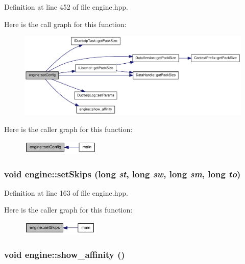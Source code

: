 Definition at line 452 of file engine.hpp.

Here is the call graph for this function:\nopagebreak
\begin{figure}[H]
\begin{center}
\leavevmode
\includegraphics[width=328pt]{classengine_ab44d977af665ec74444db0b781d765c7_cgraph}
\end{center}
\end{figure}


Here is the caller graph for this function:\nopagebreak
\begin{figure}[H]
\begin{center}
\leavevmode
\includegraphics[width=106pt]{classengine_ab44d977af665ec74444db0b781d765c7_icgraph}
\end{center}
\end{figure}
\hypertarget{classengine_aeac567ab02fa33c70071131e0ba5e25a}{
\subsubsection[{setSkips}]{\setlength{\rightskip}{0pt plus 5cm}void engine::setSkips (long {\em st}, \/  long {\em sw}, \/  long {\em sm}, \/  long {\em to})}}
\label{classengine_aeac567ab02fa33c70071131e0ba5e25a}


Definition at line 163 of file engine.hpp.

Here is the caller graph for this function:\nopagebreak
\begin{figure}[H]
\begin{center}
\leavevmode
\includegraphics[width=104pt]{classengine_aeac567ab02fa33c70071131e0ba5e25a_icgraph}
\end{center}
\end{figure}
\hypertarget{classengine_a2e4cd5ddf1d94f2e937d224c933608dd}{
\subsubsection[{show\_\-affinity}]{\setlength{\rightskip}{0pt plus 5cm}void engine::show\_\-affinity ()}}
\label{classengine_a2e4cd5ddf1d94f2e937d224c933608dd}


